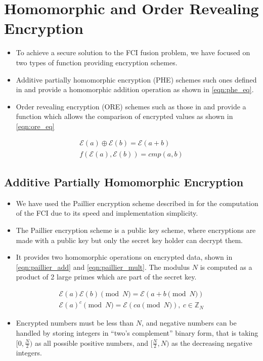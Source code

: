 \documentclass[letterpaper, 10 pt, conference]{ieeeconf}  %
\begin{document}
\section{Homomorphic and Order Revealing Encryption}
\begin{itemize}
   \item To achieve a secure solution to the FCI fusion problem, we have focused on two types of function providing encryption schemes. 
   \item Additive partially homomorphic encryption (PHE) schemes such ones defined in \cite{paillierPublicKeyCryptosystemsBased1999} and \cite{goldwasserProbabilisticEncryption1984a} provide a homomorphic addition operation as shown in \eqref{eqn:phe_eq}.
   \item Order revealing encryption (ORE) schemes such as those in \cite{chenettePracticalOrderRevealingEncryption2016} and \cite{lewiOrderRevealingEncryptionNew2016} provide a function which allows the comparison of encrypted values as shown in \eqref{eqn:ore_eq}
\end{itemize}
\begin{gather}
   \mathcal{E}(a) \oplus \mathcal{E}(b) = \mathcal{E}(a+b) \label{eqn:phe_eq}\\
   f(\mathcal{E}(a), \mathcal{E}(b)) = cmp(a, b) \label{eqn:ore_eq}
\end{gather}

\subsection{Additive Partially Homomorphic Encryption}
\begin{itemize}
   \item We have used the Paillier encryption scheme described in \cite{paillierPublicKeyCryptosystemsBased1999} for the computation of the FCI due to its speed and implementation simplicity.
   \item The Paillier encryption scheme is a public key scheme, where encryptions are made with a public key but only the secret key holder can decrypt them.
   \item It provides two homomorphic operations on encrypted data, shown in \eqref{eqn:paillier_add} and \eqref{eqn:paillier_mult}. The modulus $N$ is computed as a product of 2 large primes which are part of the secret key.
\end{itemize}
\begin{gather}
   \mathcal{E}(a)\mathcal{E}(b) \pmod{N} = \mathcal{E}(a + b \pmod{N}) \label{eqn:paillier_add}\\
   \mathcal{E}(a)^c \pmod{N} = \mathcal{E}(ca \pmod{N}),\ c \in \mathbb{Z}_N \label{eqn:paillier_mult}
\end{gather}
\begin{itemize}
   \item Encrypted numbers must be less than $N$, and negative numbers can be handled by storing integers in ``two's complement'' binary form, that is taking $[0, \frac{N}{2})$ as all possible positive numbers, and $[\frac{N}{2}, N)$ as the decreasing negative integers.
\end{itemize}
\end{document}
